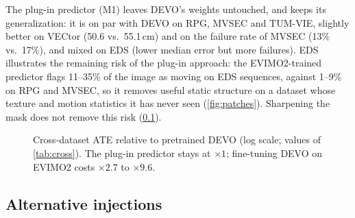 \documentclass[conference]{IEEEtran}
\begin{document}
The plug-in predictor (M1) leaves DEVO's weights untouched, and keeps its generalization:
it is on par with DEVO on RPG, MVSEC and TUM-VIE, slightly better on VECtor (50.6 vs.\
55.1\,cm) and on the failure rate of MVSEC (13\% vs.\ 17\%), and mixed on EDS (lower median
error but more failures). EDS illustrates the remaining risk of the plug-in approach: the
EVIMO2-trained predictor flags 11--35\% of the image as moving on EDS sequences, against
1--9\% on RPG and MVSEC, so it removes useful static structure on a dataset whose texture
and motion statistics it has never seen (\cref{fig:patches}). Sharpening the mask does not
remove this risk (\cref{sec:variants}).

\begin{figure}[t]
\centering
\resizebox{\columnwidth}{!}{}
\caption{Cross-dataset ATE relative to pretrained DEVO (log scale; values of
\cref{tab:cross}). The plug-in predictor stays at $\times 1$; fine-tuning DEVO on EVIMO2
costs $\times 2.7$ to $\times 9.6$.}
\label{fig:ratio}
\end{figure}

\subsection{Alternative injections}\label{sec:variants}
\end{document}
